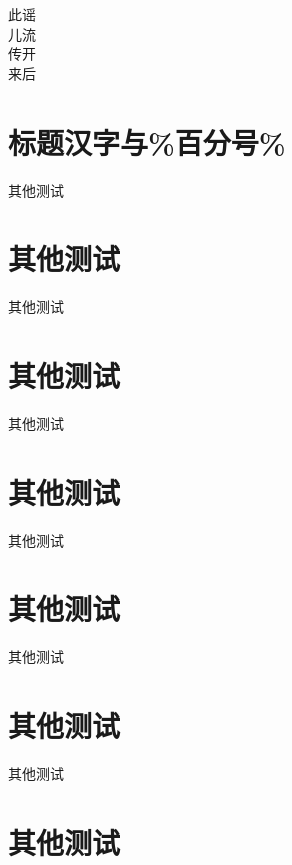 \documentclass[cs4size,a4paper,fancyhdr,fntef,fontset=windows,SlantFont,hyperref]{ctexbook}
\begin{document}







\begin{CTEXfilltwosides}{3cm}
此谣 \\
儿流 \\
传开 \\
来后
\end{CTEXfilltwosides}


\chapter{标题汉字与\%百分号\%}

其他测试

\chapter{其他测试}

其他测试

\chapter{其他测试}

其他测试

\chapter{其他测试}

其他测试

\chapter{其他测试}

其他测试

\chapter{其他测试}

其他测试

\chapter{其他测试}
\end{document}
